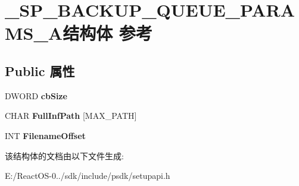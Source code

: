 \hypertarget{struct___s_p___b_a_c_k_u_p___q_u_e_u_e___p_a_r_a_m_s___a}{}\section{\+\_\+\+S\+P\+\_\+\+B\+A\+C\+K\+U\+P\+\_\+\+Q\+U\+E\+U\+E\+\_\+\+P\+A\+R\+A\+M\+S\+\_\+\+A结构体 参考}
\label{struct___s_p___b_a_c_k_u_p___q_u_e_u_e___p_a_r_a_m_s___a}
\subsection*{Public 属性}
\begin{DoxyCompactItemize}
\item 
\mbox{\label{struct___s_p___b_a_c_k_u_p___q_u_e_u_e___p_a_r_a_m_s___a_a3750ce8224aa71761fa9a8b576f1c894}} 
D\+W\+O\+RD {\bfseries cb\+Size}
\item 
\mbox{\label{struct___s_p___b_a_c_k_u_p___q_u_e_u_e___p_a_r_a_m_s___a_a6dea033b963d7713164bd7a7cdb66cbe}} 
C\+H\+AR {\bfseries Full\+Inf\+Path} \mbox{[}M\+A\+X\+\_\+\+P\+A\+TH\mbox{]}
\item 
\mbox{\label{struct___s_p___b_a_c_k_u_p___q_u_e_u_e___p_a_r_a_m_s___a_a93b7778c65ac6acdaa5ac9cf1dae9587}} 
I\+NT {\bfseries Filename\+Offset}
\end{DoxyCompactItemize}


该结构体的文档由以下文件生成\+:\begin{DoxyCompactItemize}
\item 
E\+:/\+React\+O\+S-\/0../sdk/include/psdk/setupapi.\+h\end{DoxyCompactItemize}
